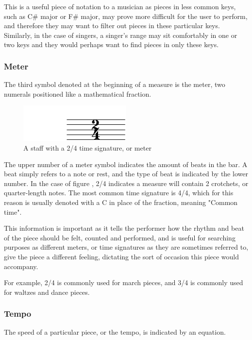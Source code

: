 This is a useful piece of notation to a musician as pieces in less common keys, such as C\# major or F\# major, may prove more difficult for the user to perform, and therefore they may want to filter out pieces in these particular keys. Similarly, in the case of singers, a singer's range may sit comfortably in one or two keys and they would perhaps want to find pieces in only these keys. 

\subsubsection{Meter}
The third symbol denoted at the beginning of a measure is the meter, two numerals positioned like a mathematical fraction.

\begin{figure}[h]
    \centering
        \includegraphics{meter-crop.pdf}
    \caption{A staff with a 2/4 time signature, or meter}
    \label{fig:meter}
\end{figure}

The upper number of a meter symbol indicates the amount of beats in the bar. A beat simply refers to a note or rest, and the type of beat is indicated by the lower number. In the case of figure \label{fig:meter}, 2/4 indicates a measure will contain 2 crotchets, or quarter-length notes. The most common time signature is 4/4, which for this reason is usually denoted with a C in place of the fraction, meaning "Common time".

This information is important as it tells the performer how the rhythm and beat of the piece should be felt, counted and performed, and is useful for searching purposes as different meters, or time signatures as they are sometimes referred to, give the piece a different feeling, dictating the sort of occasion this piece would accompany. 

For example, 2/4 is commonly used for march pieces, and 3/4 is commonly used for waltzes and dance pieces.

\subsubsection{Tempo}
The speed of a particular piece, or the tempo, is indicated by an equation.

